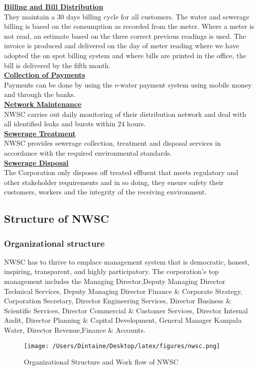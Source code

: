 \documentclass{article}
\begin{document}
\underline{\textbf{Billing and Bill Distribution}}\\
They maintain a 30 days billing cycle for all customers. The water and sewerage billing is based on the consumption as recorded from the meter. Where a meter is not read, an estimate based on the three correct previous readings is used. The invoice is produced and delivered on the day of meter reading where we have adopted the on spot billing system and where bills are printed in the office, the bill is delivered by the fifth month.\\
\underline{\textbf{Collection of Payments}}\\
Payments can be done by using the e-water payment system using mobile money and through the banks.\\
\underline{\textbf{Network Maintenance}}\\
NWSC carries out daily monitoring of their distribution network and deal with all identified leaks and bursts within 24 hours.\\
\underline{\textbf{Sewerage Treatment}}\\
NWSC provides sewerage collection, treatment and disposal services in accordance with the required environmental standards.\\
\underline{\textbf{Sewerage Disposal}}\\
The Corporation only disposes off treated effluent that meets regulatory and other stakeholder requirements and in so doing, they ensure safety their  customers, workers and the integrity of the receiving environment.     
\subsection{Structure of NWSC}
\subsubsection{Organizational structure}
NWSC has to thrive to emplace management system that is democratic, honest, inspiring, transparent, and highly participatory. The corporation's top management includes the Managing Director,Deputy Managing Director Technical Services, Deputy Managing Director Finance \& Corporate Strategy, Corporation Secretary, Director Engineering Services, Director Business \& Scientific Services, Director Commercial \& Customer Services, Director Internal Audit, Director Planning \& Capital Development, General Manager Kampala Water, Director Revenue,Finance \& Accounts.
\begin{figure}[H]
\texttt{[image: /Users/Dintaine/Desktop/latex/figures/nwsc.png]}
\caption{Organizational Structure and Work flow of NWSC}
\label{fig:structure}
\end{figure}
\end{document}
